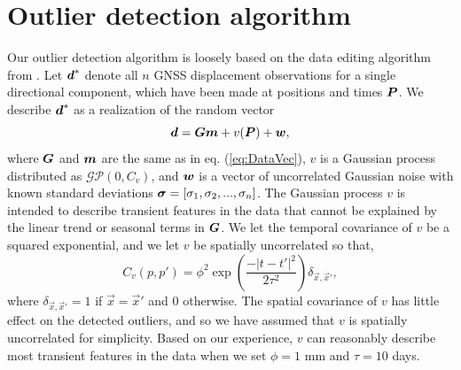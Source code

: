 \documentclass[extra,mreferee]{gji}
\begin{document}
\appendix

\section{Outlier detection algorithm}
Our outlier detection algorithm is loosely based on the data editing algorithm from \citet{Acheson1975}. Let $\mitbf{d}^*$ denote all $n$ GNSS displacement observations for a single directional component, which have been made at positions and times $\mitbf{P}$.  We describe $\mitbf{d}^*$ as a realization of the random vector 
\begin{equation}\label{eq:OutlierDataVec}
\mitbf{d} = \mitbf{G}\mitbf{m} + v(\mitbf{P}) + \mitbf{w},
\end{equation}
where $\mitbf{G}$ and $\mitbf{m}$ are the same as in eq. (\ref{eq:DataVec}), $v$ is a Gaussian process distributed as $\mathcal{GP}(0,C_v)$, and $\mitbf{w}$ is a vector of uncorrelated Gaussian noise with known standard deviations $\mitbf{\sigma} = [\sigma_1, \sigma_2, ..., \sigma_n]$. The Gaussian process $v$ is intended to describe transient features in the data that cannot be explained by the linear trend or seasonal terms in $\mitbf{G}$. We let the temporal covariance of $v$ be a squared exponential, and we let $v$ be spatially uncorrelated so that,
\begin{equation}
C_v(p,p') = \phi^2\exp\left(\frac{-|t - t'|^2}{2\tau^2}\right) \delta_{\vec{x},\vec{x}'},
\end{equation}
where $\delta_{\vec{x},\vec{x}'} = 1$ if $\vec{x} = \vec{x}'$ and $0$ otherwise. The spatial covariance of $v$ has little effect on the detected outliers, and so we have assumed that $v$ is spatially uncorrelated for simplicity. Based on our experience, $v$ can reasonably describe most transient features in the data when we set $\phi = 1$ mm and $\tau = 10$ days. 
\end{document}
